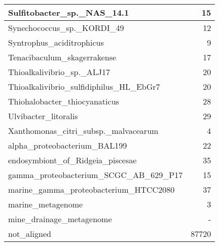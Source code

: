 \documentclass[12pt,a4paper]{article}
\begin{document}
\begin{table}[ht]
\begin{center}
\begin{tabular}{|l*{1}{|r}|}
Sulfitobacter\_sp.\_NAS\_14.1 & 15 \\ \hline
Synechococcus\_sp.\_KORDI\_49 & 12 \\ \hline
Syntrophus\_aciditrophicus & 9 \\ \hline
Tenacibaculum\_skagerrakense & 17 \\ \hline
Thioalkalivibrio\_sp.\_ALJ17 & 20 \\ \hline
Thioalkalivibrio\_sulfidiphilus\_HL\_EbGr7 & 20 \\ \hline
Thiohalobacter\_thiocyanaticus & 28 \\ \hline
Ulvibacter\_litoralis & 29 \\ \hline
Xanthomonas\_citri\_subsp.\_malvacearum & 4 \\ \hline
alpha\_proteobacterium\_BAL199 & 22 \\ \hline
endosymbiont\_of\_Ridgeia\_piscesae & 35 \\ \hline
gamma\_proteobacterium\_SCGC\_AB\_629\_P17 & 15 \\ \hline
marine\_gamma\_proteobacterium\_HTCC2080 & 37 \\ \hline
marine\_metagenome & 3 \\ \hline
mine\_drainage\_metagenome & - \\ \hline
not\_aligned & 87720 \\ \hline
\end{tabular}
\end{center}
\end{table}
\end{document}

